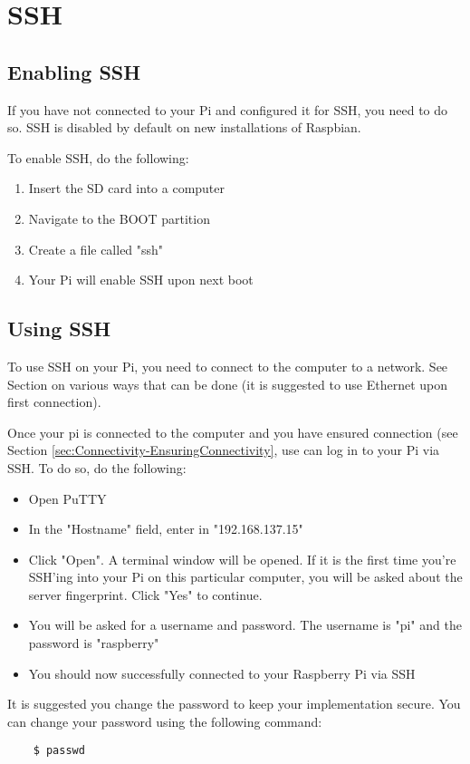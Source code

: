 \section{SSH}
\label{sec:SSH}
\subsection{Enabling SSH}
If you have not connected to your Pi and configured it for SSH, you need to do so. SSH is disabled by default on new installations of Raspbian.

To enable SSH, do the following:
\begin{enumerate}
    \item Insert the SD card into a computer 
    \item Navigate to the BOOT partition
    \item Create a file called "ssh" 
    \item Your Pi will enable SSH upon next boot
\end{enumerate}

\subsection{Using SSH}
To use SSH on your Pi, you need to connect to the computer to a network. See Section \label{sec:Connectivity} on various ways that can be done (it is suggested to use Ethernet upon first connection).

Once your pi is connected to the computer and you have ensured connection (see Section \ref{sec:Connectivity-EnsuringConnectivity}, use can log in to your Pi via SSH. To do so, do the following:

\begin{itemize}
    \item Open PuTTY
    \item In the "Hostname" field, enter in "192.168.137.15"
    \item Click "Open". A terminal window will be opened. If it is the first time you're SSH'ing into your Pi on this particular computer, you will be asked about the server fingerprint. Click "Yes" to continue.
    \item You will be asked for a username and password. The username is "pi" and the password is "raspberry"
    \item You should now successfully connected to your Raspberry Pi via SSH
\end{itemize}

It is suggested you change the password to keep your implementation secure. You can change your password using the following command:
\begin{verbatim}
    $ passwd
\end{verbatim}

